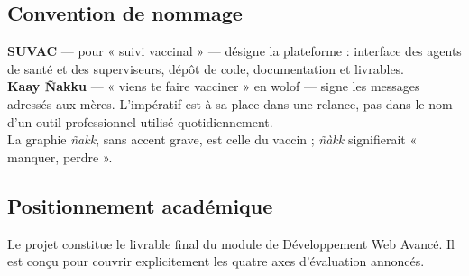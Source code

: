 \documentclass[11pt,a4paper]{article}
\begin{document}
\vspace{2mm}
\noindent
{}

\subsection{Convention de nommage}

\begin{decisionbox}
\textbf{SUVAC} — pour « suivi vaccinal » — désigne la plateforme : interface des agents
de santé et des superviseurs, dépôt de code, documentation et livrables. \\[4pt]
\textbf{Kaay Ñakku} — « viens te faire vacciner » en wolof — signe les messages adressés
aux mères. L'impératif est à sa place dans une relance, pas dans le nom d'un outil
professionnel utilisé quotidiennement. \\[4pt]
La graphie \textit{ñakk}, sans accent grave, est celle du vaccin ; \textit{ñàkk}
signifierait « manquer, perdre ».
\end{decisionbox}

\subsection{Positionnement académique}

Le projet constitue le livrable final du module de Développement Web Avancé. Il est
conçu pour couvrir explicitement les quatre axes d'évaluation annoncés.
\end{document}
